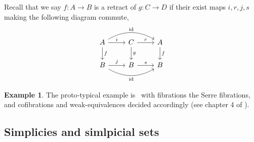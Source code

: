 \documentclass{amsart}
\newcommand{\catname}[1]{{\sffamily\upshape{{#1}}}}
\newcommand{\topp}{\catname{Top}}
\DeclareMathOperator{\id}{id} \DeclareMathOperator{\Fun}{Fun}
\theoremstyle{definition}
\newtheorem{example}[theorem]{Example}
\begin{document}
\noindent
Recall that we say $f:A\to B$ is a retract of $g: C\to D$ if their exist maps $i,r, j,s$
making the following diagram commute,
\[
  \begin{tikzcd}
    A \arrow[r, "i"]\arrow[d,"f"]\arrow[rr,bend left=30, "\id"] & C\arrow[r,"r"]\arrow[d,"g"] & A \arrow[d, "f"] \\
    B \arrow[r, "j"] \arrow[rr,bend right=30, "\id"']& B \arrow[r, "s"]& B
  \end{tikzcd}
\]
\begin{example}
  The proto-typical example is \topp \, with fibrations the Serre fibrations,
  and cofibrations and weak-equivalences decided accordingly (see chapter 4 of
  \cite{Hat}).
\end{example}

\subsection{Simplicies and simlpicial sets}
\end{document}
